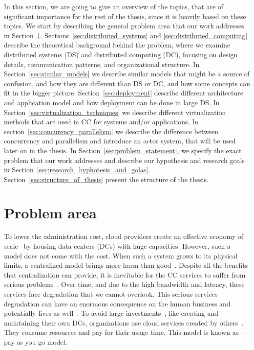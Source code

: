 In this section, we are going to give an overview of the topics, that are of significant importance for the rest of the thesis, since it is heavily based on these topics. We start by describing the general problem area that our work addresses in Section~\ref{sec:problem_area}. Sections~\ref{sec:distributed_systems} and \ref{sec:distributed_computing} describe the theoretical background behind the problem, where we examine distributed systems (DS) and distributed computing (DC), focusing on design details, communication patterns, and organizational structure. In Section~\ref{sec:similar_models} we describe similar models that might be a source of confusion, and how they are different than DS or DC, and how some concepts can fit in the bigger picture. Section~\ref{sec:deployment} describe different architecture and application model and how deployment can be done in large DS. In Section~\ref{sec:virtualization_techniques} we describe different virtualization methods that are used in CC for systems and/or applications. In section~\ref{sec:concurency_parallelism} we describe the difference between concurrency and parallelism and introduce an actor system, that will be used later on in the thesis. In Section~\ref{sec:problem_statement}, we specify the exact problem that our work addresses and describe our hypothesis and research goals in Section~\ref{sec:research_hyphotesis_and_golas}. Section~\ref{sec:structure_of_thesis} present the structure of the thesis.
%
%
%
\section{Problem area}\label{sec:problem_area}
%
To lower the administration cost, cloud providers create an effective economy of scale~\cite{BariBEGPRZZ13} by housing data-centers (DCs) with huge capacities. However, such a model does not come with the cost. When such a  system grows to its physical limits, a centralized model brings more harm than good~\cite{GunawiHSLSAE16, LopezMEDHIBFR15}. Despite all the benefits that centralization can provide, it is inevitable for the CC services to suffer from serious problems~\cite{KarimIWGSYO16}. Over time, and due to the high bandwidth and latency, these services face degradation that we cannot overlook. This serious services degradation can have an enormous consequence on the human business and potentially lives as well~\cite{El-SayedSPPGML18}. To avoid large investments~\cite{MonsalveCC18}, like creating and maintaining their own DCs, organizations use cloud services created by others~\cite{Satyanarayanan17}. They consume resources and pay for their usage time. This model is known as -- pay as you go model.

